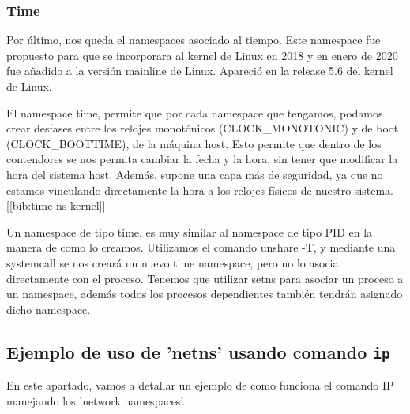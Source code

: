 \documentclass[12pt]{article}
\begin{document}
	
	\pagebreak
	\subsubsection{Time}
	\par \noindent Por último, nos queda el namespaces asociado al tiempo. Este namespace fue propuesto para que se incorporara al kernel de Linux en 2018 y en enero de 2020 fue añadido a la versión mainline de Linux. Apareció en la release 5.6 del kernel de Linux. \\
	
	\par \noindent El namespace time, permite que por cada namespace que tengamos, podamos crear desfases entre los relojes monotónicos (CLOCK\_MONOTONIC) y de boot (CLOCK\_BOOTTIME), de la máquina host. Esto permite que dentro de los contendores se nos permita cambiar la fecha y la hora, sin tener que modificar la hora del sistema host. Además, supone una capa más de seguridad, ya que no estamos vinculando directamente la hora a los relojes físicos de nuestro sistema. [\ref{bib:time ns kernel}]\\
	
	\par \noindent Un namespace de tipo time, es muy similar al namespace de tipo PID en la manera de como lo creamos. Utilizamos el comando unshare -T, y mediante una systemcall se nos creará un nuevo time namespace, pero no lo asocia directamente con el proceso. Tenemos que utilizar setns para asociar un proceso a un namespace, además todos los procesos dependientes también tendrán asignado dicho namespace. 
	
	\addvspace{80px}
	
	
	\pagebreak
	
	\subsection{Ejemplo de uso de 'netns' usando comando \texttt{ip}}
	\noindent En este apartado, vamos a detallar un ejemplo de como funciona el comando IP manejando los 'network namespaces'.\\
	
\end{document}
